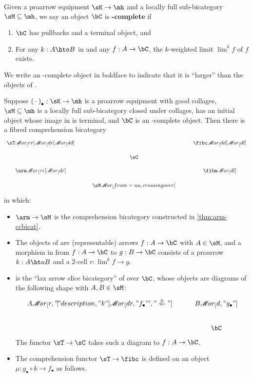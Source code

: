 \documentclass{amsart}
\def\ar#1{\mathscr{M}\!\mathit{or}_{#1}}
\def\rep#1{{#1}_\bullet}
\let\mylim\lim
\def\lim{{\textstyle\mylim}}
\begin{document}
\begin{defn}
  Given a proarrow equipment $\sK\to\mh$ and a locally full sub-bicategory $\sM\subseteq \mh$, we say an object $\bC$ is \textbf{\sM-complete} if
  \begin{enumerate}
  \item $\bC$ has pullbacks and a terminal object, and
  \item For any $k:A\hto B$ in \sM and any $f:A\to \bC$, the $k$-weighted limit $\lim^k f$ of $f$ exists.
  \end{enumerate}
\end{defn}

We write an \sM-complete object in boldface to indicate that it is ``larger'' than the objects of \sM.

\begin{prob}\label{thm:arm-fibicc}
  Suppose $\rep{(\blank)}:\sK\to\mh$ is a proarrow equipment with good collages, $\sM\subseteq \mh$ is a locally full sub-bicategory closed under collages, \sK has an initial object whose image in \mh is terminal, and $\bC$ is an \sM-complete object.
  Then there is a fibred comprehension bicategory
  \[
  \begin{tikzcd}[row sep=small]
    \sT \ar[rr] \ar[dr] \ar[dd] && \fibc \ar[dd] \ar[dl] \\
    & \sC \\
    \arm \ar[rr] \ar[dr] && \fibm \ar[dl] \\
    & \sM \ar[from=uu,crossing over]
  \end{tikzcd}
  \]
  in which:
  \begin{itemize}
  \item $\arm\to\sM$ is the comprehension bicategory constructed in \cref{thm:arm-ccbicat}.
  \item The objects of \sC are (representable) arrows $f:A\to \bC$ with $A\in\sM$, and a morphism in \sC from $f:A\to \bC$ to $g:B\to \bC$ consists of a proarrow $k:A\hto B$ and a 2-cell $r:\lim^k f \to g$.
  \item \sT is the ``lax arrow slice bicategory'' of \sM over $\bC$, whose objects are diagrams of the following shape with $A,B\in\sM$:
    \[
    \begin{tikzcd}
      A \ar[r,"\mathclap{|}" description,"k"] \ar[dr,"\rep f"',"\overset\kappa\Leftarrow"] & B \ar[d,"\rep g"] \\ & \bC
    \end{tikzcd}
    \]
    The functor $\sT\to\sC$ takes such a diagram to $f:A\to\bC$.
  \item The comprehension functor $\sT\to\fibc$ is defined on an object $\mu:\rep g \circ k \to \rep f$ as follows.

\end{itemize}
\end{prob}
\end{document}
